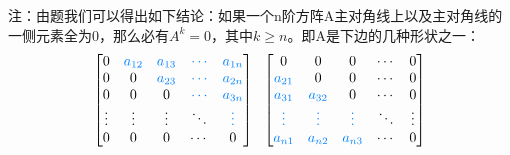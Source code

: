 \documentclass{article}
\begin{document}
\begin{jie}
\textcolor[rgb]{1.00,0.00,0.00}{注：由题我们可以得出如下结论：如果一个n阶方阵A主对角线上以及主对角线的一侧元素全为0，那么必有$A^{k}=0$，其中$k\geq n$。即A是下边的几种形状之一：
\begin{equation*}
\begin{bmatrix}
  0 &\textcolor[rgb]{0.00,0.50,1.00}{ a_{12}}&\textcolor[rgb]{0.00,0.50,1.00}{a_{13}}&\textcolor[rgb]{0.00,0.50,1.00}{\cdots}&\textcolor[rgb]{0.00,0.50,1.00}{a_{1n}} \\
  0& 0&\textcolor[rgb]{0.00,0.50,1.00}{a_{23}}&\textcolor[rgb]{0.00,0.50,1.00}{\cdots}&\textcolor[rgb]{0.00,0.50,1.00}{a_{2n}}\\
   0&0&0&\textcolor[rgb]{0.00,0.50,1.00}{\cdots}&\textcolor[rgb]{0.00,0.50,1.00}{a_{3n}}\\
  \vdots&\vdots&\vdots&\ddots&\textcolor[rgb]{0.00,0.50,1.00}{\vdots}\\
  0&0&0&\cdots&0
\end{bmatrix}
~~
\begin{bmatrix}
  0 & 0&0&\cdots&0 \\
  \textcolor[rgb]{0.00,0.50,1.00}{a_{21}}& 0&0&\cdots&0\\
   \textcolor[rgb]{0.00,0.50,1.00}{a_{31}}&\textcolor[rgb]{0.00,0.50,1.00}{a_{32}}&0&\cdots&0\\
  \textcolor[rgb]{0.00,0.50,1.00}{\vdots}&\textcolor[rgb]{0.00,0.50,1.00}{\vdots}&\textcolor[rgb]{0.00,0.50,1.00}{\vdots}&\ddots&\vdots\\
  \textcolor[rgb]{0.00,0.50,1.00}{a_{n1}}&\textcolor[rgb]{0.00,0.50,1.00}{a_{n2}}&\textcolor[rgb]{0.00,0.50,1.00}{a_{n3}}&\cdots&0
\end{bmatrix}
\end{equation*}
}
\end{jie}
\end{document}
